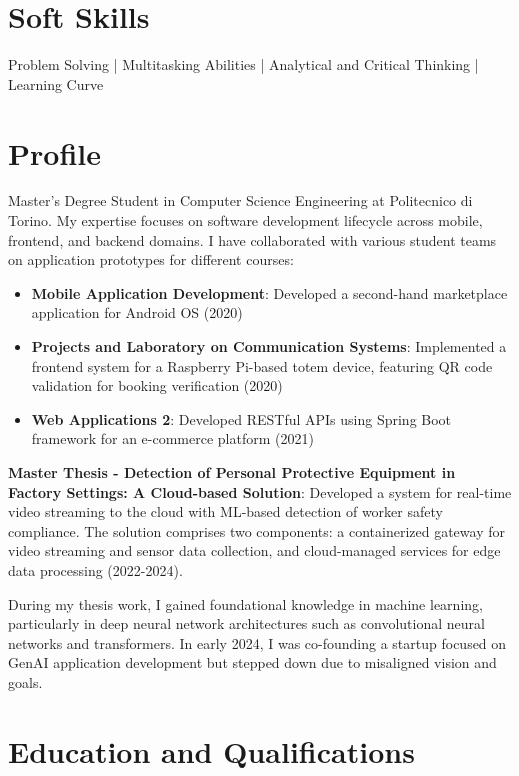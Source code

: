 \documentclass[10.5pt,a4paper]{article}
\begin{document}
\section*{Soft Skills}
Problem Solving | Multitasking Abilities | Analytical and Critical Thinking | Learning Curve


\section*{Profile}
Master's Degree Student in Computer Science Engineering at Politecnico di Torino. My expertise focuses on software development lifecycle across mobile, frontend, and backend domains. I have collaborated with various student teams on application prototypes for different courses:

\begin{itemize}[leftmargin=*]
\item \textbf{Mobile Application Development}: Developed a second-hand marketplace application for Android OS (2020)
\item \textbf{Projects and Laboratory on Communication Systems}: Implemented a frontend system for a Raspberry Pi-based totem device, featuring QR code validation for booking verification (2020)
\item \textbf{Web Applications 2}: Developed RESTful APIs using Spring Boot framework for an e-commerce platform (2021)
\end{itemize}

\textbf{Master Thesis - Detection of Personal Protective Equipment in Factory Settings: A Cloud-based Solution}: Developed a system for real-time video streaming to the cloud with ML-based detection of worker safety compliance. The solution comprises two components: a containerized gateway for video streaming and sensor data collection, and cloud-managed services for edge data processing (2022-2024).

\vspace{1ex}
During my thesis work, I gained foundational knowledge in machine learning, particularly in deep neural network architectures such as convolutional neural networks and transformers. In early 2024, I was co-founding a startup focused on GenAI application development but stepped down due to misaligned vision and goals.

\section*{Education and Qualifications}
\end{document}
